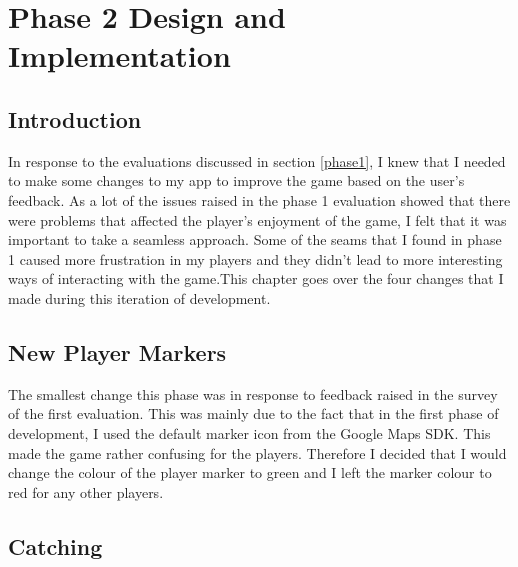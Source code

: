 \documentclass{l4proj}
\begin{document}
\chapter{Phase 2 Design and Implementation}

\section{Introduction}
In response to the evaluations discussed in section \ref{phase1}, I knew that I needed to make some changes to my app
to improve the game based on the user's feedback. As a lot of the issues raised in the phase 1 evaluation showed that
there were problems that affected the player's enjoyment of the game, I felt that it was important to take a seamless
approach. Some of the seams that I found in phase 1 caused more frustration in my players and they didn't lead to more
interesting ways of interacting with the game.This chapter goes over the four changes that I made during this
iteration of development.

\section{New Player Markers}
The smallest change this phase was in response to feedback raised in the survey of the first evaluation. This was mainly
due to the fact that in the first phase of development, I used the default marker icon from the Google Maps SDK. This
made the game rather confusing for the players. Therefore I decided that I would change the colour of the player marker
to green and I left the marker colour to red for any other players. 

\section{Catching}
\end{document}
